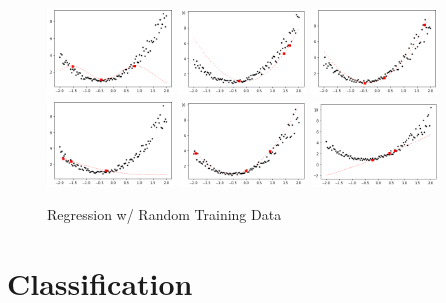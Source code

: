 \documentclass[12pt]{article}
\begin{document}
\begin{figure}[h]
\centering
\includegraphics[width=0.3\textwidth]{Post_3_rand1}
\includegraphics[width=0.3\textwidth]{Post_3_rand2}
\includegraphics[width=0.3\textwidth]{Post_3_rand3}
\includegraphics[width=0.3\textwidth]{Post_3_rand4}
\includegraphics[width=0.3\textwidth]{Post_3_rand5}
\includegraphics[width=0.3\textwidth]{Post_3_rand6}
\caption{Regression w/ Random Training Data}
\end{figure}

\section{Classification}
\end{document}
